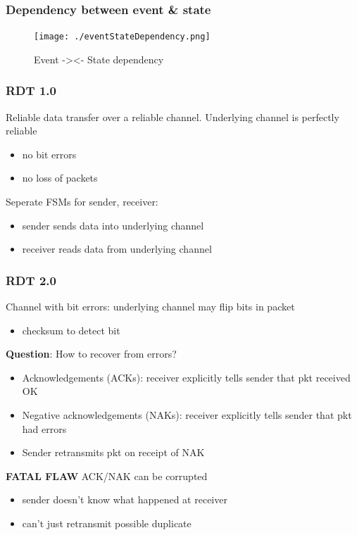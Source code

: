 \documentclass[11pt]{article}
\begin{document}
\subsubsection{Dependency between event \& state}
\label{sec:org92ca747}

\begin{figure}[htbp]
\centering
\texttt{[image: ./eventStateDependency.png]}
\caption{Event -><- State dependency}
\end{figure}


\subsubsection{RDT 1.0}
\label{sec:org8a8d285}
Reliable data transfer over a reliable channel. Underlying channel is
perfectly reliable
\begin{itemize}
\item no bit errors
\item no loss of packets
\end{itemize}

Seperate FSMs for sender, receiver:
\begin{itemize}
\item sender sends data into underlying channel
\item receiver reads data from underlying channel
\end{itemize}

\subsubsection{RDT 2.0}
\label{sec:org3aa297e}
Channel with bit errors: underlying channel may flip bits in packet
\begin{itemize}
\item checksum to detect bit
\end{itemize}

\textbf{Question}: How to recover from errors?

\begin{itemize}
\item Acknowledgements (ACKs): receiver explicitly tells sender that pkt
received OK
\item Negative acknowledgements (NAKs): receiver explicitly tells sender
that pkt had errors
\item Sender retransmits pkt on receipt of NAK
\end{itemize}

\textbf{FATAL FLAW}
ACK/NAK can be corrupted
\begin{itemize}
\item sender doesn't know what happened at receiver
\item can't just retransmit possible duplicate
\end{itemize}
\end{document}

